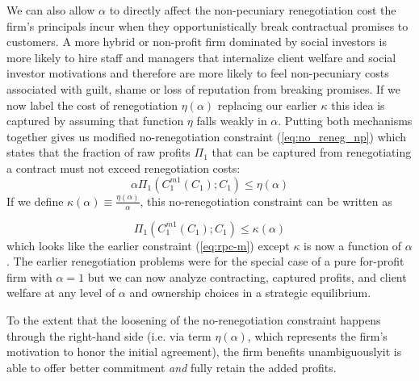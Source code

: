 \documentclass[11pt,english]{article}
\theoremstyle{plain}
\theoremstyle{definition}
\begin{document}
We can also allow $\alpha$ to directly affect the non-pecuniary
renegotiation cost the firm's principals incur when they opportunistically
break contractual promises to customers. A more hybrid or non-profit
firm dominated by social investors is more likely to hire staff and
managers that internalize client welfare and social investor motivations
and therefore are more likely to feel non-pecuniary costs associated
with guilt, shame or loss of reputation from breaking promises. If
we now label the cost of renegotiation $\eta\left(\alpha\right)$
\textendash{} replacing our earlier $\kappa$ \textendash{} this idea
is captured by assuming that function $\eta$ falls weakly in $\alpha$.
Putting both mechanisms together gives us modified no-renegotiation
constraint (\ref{eq:no_reneg_np}) which states that the fraction
of raw profits $\Pi_{1}$ that can be captured from renegotiating
a contract must not exceed renegotiation costs: 
\begin{equation}
\alpha\Pi_{1}(C_{1}^{m1}(C_{1});C_{1})\leq\eta(\alpha)\label{eq:no_reneg_np}
\end{equation}
If we define $\kappa(\alpha)\equiv\frac{\eta(\alpha)}{\alpha}$, this
no-renegotiation constraint can be written as

\begin{equation}
  \Pi_{1}(C_{1}^{m1}(C_{1});C_{1})\leq\kappa(\alpha)\label{eq:no-kalpha}
\end{equation}
which looks like the earlier constraint (\ref{eq:rpc-m})
except $\kappa$ is now a function of $\alpha$. The earlier renegotiation
problems were for the special case of a pure for-profit firm with
$\alpha=1$ but we can now analyze contracting, captured profits,
and client welfare at any level of $\alpha$ and ownership choices
in a strategic equilibrium. 

To the extent that the loosening of the no-renegotiation constraint
happens through the right-hand side (i.e. via term $\eta\left(\alpha\right)$,
which represents the firm's motivation to honor the initial agreement),
the firm benefits unambiguously\textendash it is able to offer better
commitment \emph{and} fully retain the added profits.
\end{document}
